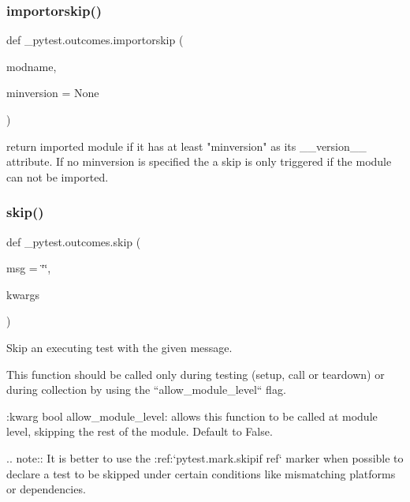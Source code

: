 \subsubsection{\texorpdfstring{importorskip()}{importorskip()}}
{\footnotesize\ttfamily def \+\_\+pytest.\+outcomes.\+importorskip (\begin{DoxyParamCaption}\item[{}]{modname,  }\item[{}]{minversion = {\ttfamily None} }\end{DoxyParamCaption})}

\begin{DoxyVerb}return imported module if it has at least "minversion" as its
__version__ attribute.  If no minversion is specified the a skip
is only triggered if the module can not be imported.
\end{DoxyVerb}
 \mbox{\label{namespace__pytest_1_1outcomes_a0866db5a141b016319ad83acc9febc06}} 
\subsubsection{\texorpdfstring{skip()}{skip()}}
{\footnotesize\ttfamily def \+\_\+pytest.\+outcomes.\+skip (\begin{DoxyParamCaption}\item[{}]{msg = {\ttfamily \char`\"{}\char`\"{}},  }\item[{}]{kwargs }\end{DoxyParamCaption})}

\begin{DoxyVerb}Skip an executing test with the given message.

This function should be called only during testing (setup, call or teardown) or
during collection by using the ``allow_module_level`` flag.

:kwarg bool allow_module_level: allows this function to be called at
    module level, skipping the rest of the module. Default to False.

.. note::
    It is better to use the :ref:`pytest.mark.skipif ref` marker when possible to declare a test to be
    skipped under certain conditions like mismatching platforms or
    dependencies.
\end{DoxyVerb}
 \mbox{\label{namespace__pytest_1_1outcomes_a361095ab4d4b94436fbdf2663384f485}} 
